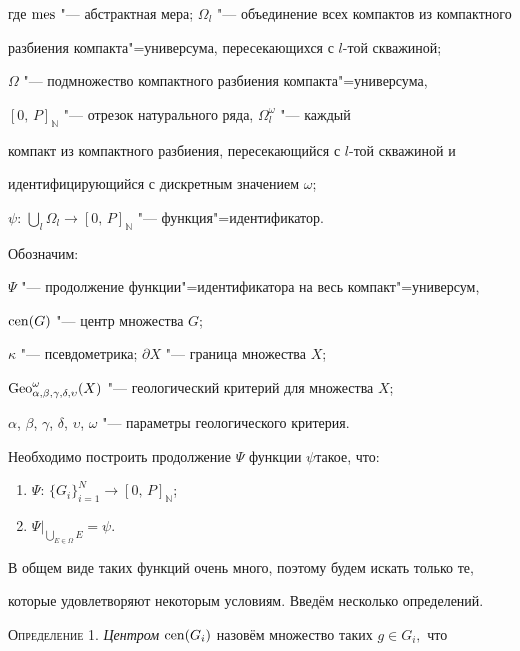  где ${\rm mes}$ "--- абстрактная мера; $\Omega _l $ "--- объединение всех компактов из компактного

разбиения компакта"=универсума, пересекающихся с $l$-той скважиной;

$\Omega $ "--- подмножество компактного разбиения компакта"=универсума,

$[0,\, P]_{\mathbb N} $ "--- отрезок натурального ряда, $\Omega _l^\omega $ "--- каждый

компакт из компактного разбиения, пересекающийся с $l$-той скважиной и

идентифицирующийся с дискретным значением $\omega $;

$\psi {:}\,\bigcup\limits_l \Omega _l  \to [0,\, P]_{\mathbb N} $ "--- функция"=идентификатор.



Обозначим:

$\Psi $ "--- продолжение функции"=идентификатора на весь компакт"=универсум,

${\rm cen}(G)$ "--- центр множества $G$;

$\kappa $ "--- псевдометрика; $\partial X$ "--- граница множества $X$;

${\rm Geo}_{\alpha, \beta, \gamma, \delta, \upsilon }^\omega(X)$ "--- геологический критерий для множества $X$;

$\alpha$, $\beta$, $\gamma$, $\delta$, $\upsilon$, $\omega $ "--- параметры геологического критерия.



Необходимо построить продолжение $\Psi$ функции $\psi $такое, что:

\begin{enumerate}

 \item $\Psi {:}\, \bigl\{ G_i \bigr\}_{i=1}^N \to [0,\, P]_{\mathbb N} $;

\item  $\Psi \Big|_{\bigcup\limits_{E\in \Omega } E } =\psi .$



\end{enumerate}





В общем виде таких функций очень много, поэтому будем искать только те,

которые удовлетворяют некоторым условиям. Введём несколько определений.



\textsc{\small Определение 1.} {\it Центром} ${\rm cen}(G_i)$ назовём множество таких $g\in G_i ,$ что

